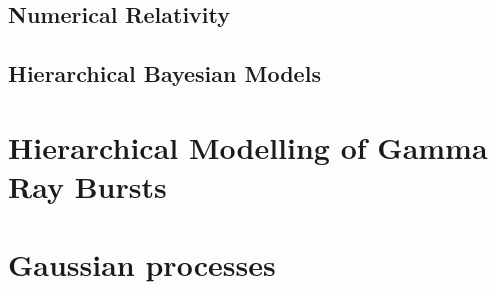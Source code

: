 \documentclass{kentigern}
\theoremstyle{definition}
\begin{document}

\section{Numerical Relativity}
\label{sec:numerical-relativity}


\section{Hierarchical Bayesian Models}
\label{sec:hierarchical-models}

\chapter{Hierarchical Modelling of Gamma Ray Bursts}
\label{cha:gamma-ray-burst}

\chapter{Gaussian processes}
\label{cha:gaussian-process}
\chapterprecis{}



%





\end{document}
